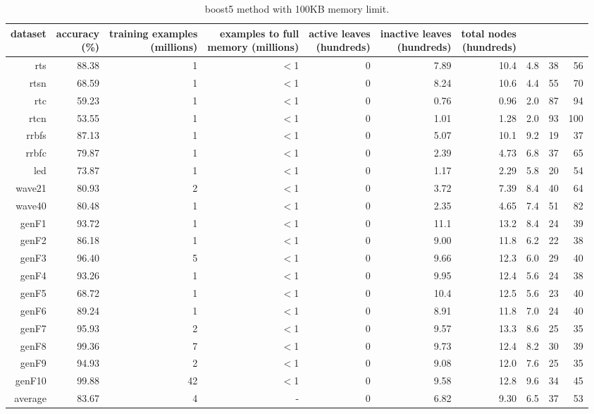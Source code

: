 \begin{table}
\caption{{\sc boost5} method with 100KB memory limit.}
\label{tab:boost5-100k}
\centering
\begin{tabular}{|r|r|r|r|r|r|r|r|r|r|}
\hline
dataset	&
\rotatebox{90}{\parbox{9em}{accuracy\\(\%)}} &
\rotatebox{90}{\parbox{9em}{training examples\\(millions)}} &
\rotatebox{90}{\parbox{9em}{examples to full\\memory (millions)}} &
\rotatebox{90}{\parbox{9em}{active leaves\\(hundreds)}} &
\rotatebox{90}{\parbox{9em}{inactive leaves\\(hundreds)}} &
\rotatebox{90}{\parbox{9em}{total nodes\\(hundreds)}} &
\rotatebox{90}{\parbox{9em}{average tree depth}}	&
\rotatebox{90}{\parbox{9em}{training speed (\%)}} &
\rotatebox{90}{\parbox{9em}{prediction speed (\%)}} \\
\hline
{\sc rts} & 88.38 & 1 & $<$1 & 0 & 7.89 & 10.4 & 4.8 & 38 & 56 \\
{\sc rtsn} & 68.59 & 1 & $<$1 & 0 & 8.24 & 10.6 & 4.4 & 55 & 70 \\
{\sc rtc} & 59.23 & 1 & $<$1 & 0 & 0.76 & 0.96 & 2.0 & 87 & 94 \\
{\sc rtcn} & 53.55 & 1 & $<$1 & 0 & 1.01 & 1.28 & 2.0 & 93 & 100 \\
{\sc rrbfs} & 87.13 & 1 & $<$1 & 0 & 5.07 & 10.1 & 9.2 & 19 & 37 \\
{\sc rrbfc} & 79.87 & 1 & $<$1 & 0 & 2.39 & 4.73 & 6.8 & 37 & 65 \\
{\sc led} & 73.87 & 1 & $<$1 & 0 & 1.17 & 2.29 & 5.8 & 20 & 54 \\
{\sc wave21} & 80.93 & 2 & $<$1 & 0 & 3.72 & 7.39 & 8.4 & 40 & 64 \\
{\sc wave40} & 80.48 & 1 & $<$1 & 0 & 2.35 & 4.65 & 7.4 & 51 & 82 \\
{\sc genF1} & 93.72 & 1 & $<$1 & 0 & 11.1 & 13.2 & 8.4 & 24 & 39 \\
{\sc genF2} & 86.18 & 1 & $<$1 & 0 & 9.00 & 11.8 & 6.2 & 22 & 38 \\
{\sc genF3} & 96.40 & 5 & $<$1 & 0 & 9.66 & 12.3 & 6.0 & 29 & 40 \\
{\sc genF4} & 93.26 & 1 & $<$1 & 0 & 9.95 & 12.4 & 5.6 & 24 & 38 \\
{\sc genF5} & 68.72 & 1 & $<$1 & 0 & 10.4 & 12.5 & 5.6 & 23 & 40 \\
{\sc genF6} & 89.24 & 1 & $<$1 & 0 & 8.91 & 11.8 & 7.0 & 24 & 40 \\
{\sc genF7} & 95.93 & 2 & $<$1 & 0 & 9.57 & 13.3 & 8.6 & 25 & 35 \\
{\sc genF8} & 99.36 & 7 & $<$1 & 0 & 9.73 & 12.4 & 8.2 & 30 & 39 \\
{\sc genF9} & 94.93 & 2 & $<$1 & 0 & 9.08 & 12.0 & 7.6 & 25 & 35 \\
{\sc genF10} & 99.88 & 42 & $<$1 & 0 & 9.58 & 12.8 & 9.6 & 34 & 45 \\
\hline
average & 83.67 & 4 &  -  & 0 & 6.82 & 9.30 & 6.5 & 37 & 53 \\
\hline
\end{tabular}
\end{table}
